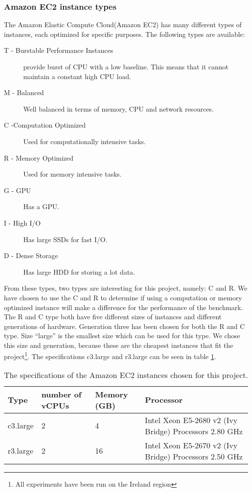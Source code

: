 \subsubsection{Amazon EC2 instance types}
\label{hw:Amazon}
The Amazon Elastic Compute Cloud(Amazon EC2) has many different types of instances, each optimized for specific purposes\cite{amazon-instances}. The following types are available:
\begin{description}
\item[T - Burstable Performance Instances] provide burst of CPU with a low baseline. This means that it cannot maintain a constant high CPU load.
\item[M - Balanced] Well balanced in terms of memory, CPU and network resources.
\item[C -Computation Optimized] Used for computationally intensive tasks.
\item[R - Memory Optimized] Used for memory intensive tasks.
\item[G - GPU] Has a GPU.
\item[I - High I/O] Has large SSDs for fast I/O.
\item[D - Dense Storage] Has large HDD for storing a lot data.
\end{description}
From these types, two types are interesting for this project, namely: C and R. We have chosen to use the C and R to determine if using a computation or memory optimized instance will make a difference for the performance of the benchmark.
The R and C type both have five different sizes of instances and different generations of hardware. Generation three has been chosen for both the R and C type. Size ``large'' is the smallest size which can be used for this type. We chose this size and generation, because these are the cheapest instances that fit the project\footnote{ All experiments have been run on the Ireland region}. The specifications c3.large and r3.large can be seen in table \ref{tab:specs-amazon}.

\begin{table}[!h]
\begin{center}
\begin{tabular}{|l|l|l|l|}
\hline
Type & number of vCPUs & Memory (GB) & Processor \\ \hline
c3.large & 2 & 4 & Intel Xeon E5-2680 v2 (Ivy Bridge) Processors 2.80 GHz \\ \hline
r3.large & 2 & 16 & Intel Xeon E5-2670 v2 (Ivy Bridge) Processors 2.50 GHz \\ \hline
\end{tabular}
\end{center}
\caption{The specifications of the Amazon EC2 instances chosen for this project.}
\label{tab:specs-amazon}
\end{table}
